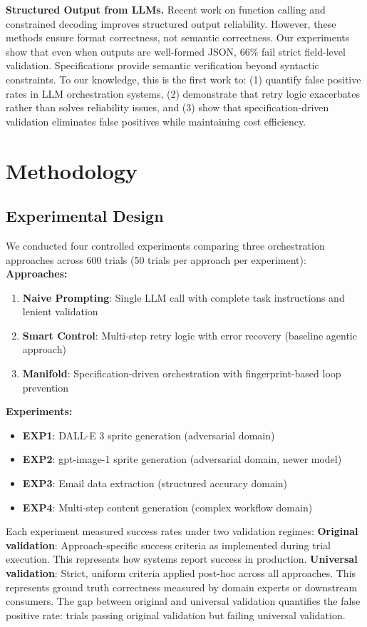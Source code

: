 \documentclass{article}
\begin{document}
\textbf{Structured Output from LLMs.} Recent work on function calling \citep{openai2023function} and constrained decoding \citep{beurer2024guiding} improves structured output reliability. However, these methods ensure format correctness, not semantic correctness. Our experiments show that even when outputs are well-formed JSON, 66\% fail strict field-level validation. Specifications provide semantic verification beyond syntactic constraints.
To our knowledge, this is the first work to: (1) quantify false positive rates in LLM orchestration systems, (2) demonstrate that retry logic exacerbates rather than solves reliability issues, and (3) show that specification-driven validation eliminates false positives while maintaining cost efficiency.

\section{Methodology}

\subsection{Experimental Design}
We conducted four controlled experiments comparing three orchestration approaches across 600 trials (50 trials per approach per experiment):
\textbf{Approaches:}
\begin{enumerate}
\item \textbf{Naive Prompting}: Single LLM call with complete task instructions and lenient validation
\item \textbf{Smart Control}: Multi-step retry logic with error recovery (baseline agentic approach)
\item \textbf{Manifold}: Specification-driven orchestration with fingerprint-based loop prevention
\end{enumerate}
\textbf{Experiments:}
\begin{itemize}
\item \textbf{EXP1}: DALL-E 3 sprite generation (adversarial domain)
\item \textbf{EXP2}: gpt-image-1 sprite generation (adversarial domain, newer model)
\item \textbf{EXP3}: Email data extraction (structured accuracy domain)
\item \textbf{EXP4}: Multi-step content generation (complex workflow domain)
\end{itemize}
Each experiment measured success rates under two validation regimes:
\textbf{Original validation}: Approach-specific success criteria as implemented during trial execution. This represents how systems report success in production.
\textbf{Universal validation}: Strict, uniform criteria applied post-hoc across all approaches. This represents ground truth correctness measured by domain experts or downstream consumers.
The gap between original and universal validation quantifies the false positive rate: trials passing original validation but failing universal validation.
\end{document}
